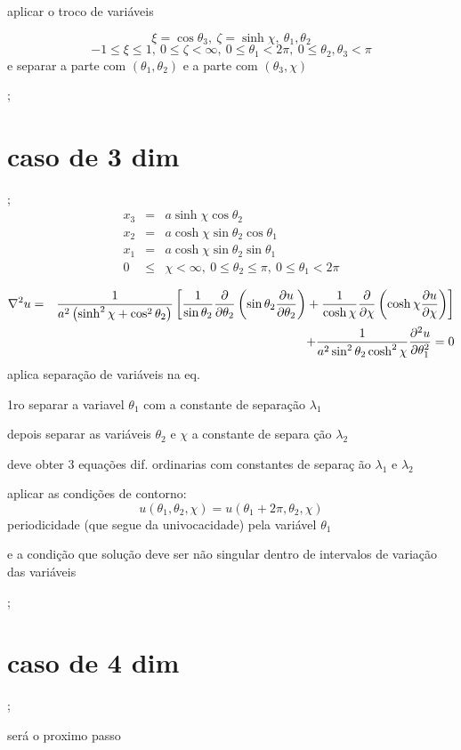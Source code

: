 \documentclass[a4paper,12pt]{article}
\begin{document}
aplicar o troco de vari\'{a}veis

\begin{equation*}
\xi =\cos \theta _{3},\ \zeta =\sinh \chi ,\ \theta _{1},\theta _{2}
\end{equation*}%
\begin{equation*}
-1\leq \xi \leq 1,\ 0\leq \zeta <\infty ,\ 0\leq \theta _{1}<2\pi ,\ 0\leq
\theta _{2},\theta _{3}<\pi 
\end{equation*}%
e separar a parte com $\left( \theta _{1},\theta _{2}\right) $ e a parte com 
$\left( \theta _{3},\chi \right) $

;

\section{caso de 3 dim}

;%
\begin{eqnarray*}
x_{3} &=&a\sinh \chi \cos \theta _{2} \\
x_{2} &=&a\cosh \chi \sin \theta _{2}\cos \theta _{1} \\
x_{1} &=&a\cosh \chi \sin \theta _{2}\sin \theta _{1} \\
0 &\leq &\chi <\infty ,\ 0\leq \theta _{2}\leq \pi ,\ 0\leq \theta _{1}<2\pi 
\end{eqnarray*}

\begin{eqnarray*}
\nabla ^{2}u &=&\frac{1}{a^{2}\left( \sinh ^{2}\chi +\cos ^{2}\theta
_{2}\right) }\left[ \frac{1}{\sin \theta _{2}}\frac{\partial }{\partial
\theta _{2}}\left( \sin \theta _{2}\frac{\partial u}{\partial \theta _{2}}%
\right) +\frac{1}{\cosh \chi }\frac{\partial }{\partial \chi }\left( \cosh
\chi \frac{\partial u}{\partial \chi }\right) \right]  \\
&&+\frac{1}{a^{2}\sin ^{2}\theta _{2}\cosh ^{2}\chi }\frac{\partial ^{2}u}{%
\partial \theta _{1}^{2}}=0
\end{eqnarray*}%
aplica separa\c{c}\~{a}o de vari\'{a}veis na eq.

1ro separar a variavel $\theta _{1}$ com a constante de separa\c{c}\~{a}o $%
\lambda _{1}$

depois separar as vari\'{a}veis $\theta _{2}$ e $\chi $ a constante de separa%
\c{c}\~{a}o $\lambda _{2}$

deve obter 3 equa\c{c}\~{o}es dif. ordinarias com constantes de separa\c{c}%
\~{a}o $\lambda _{1}$ e $\lambda _{2}$

aplicar as condi\c{c}\~{o}es de contorno: 
\begin{equation*}
u\left( \theta _{1},\theta _{2},\chi \right) =u\left( \theta _{1}+2\pi
,\theta _{2},\chi \right) 
\end{equation*}%
periodicidade (que segue da univocacidade) pela vari\'{a}vel $\theta _{1}$

e a condi\c{c}\~{a}o que solu\c{c}\~{a}o deve ser n\~{a}o singular dentro de
intervalos de varia\c{c}\~{a}o das vari\'{a}veis

;

\section{caso de 4 dim}

;

ser\'{a} o proximo passo
\end{document}
